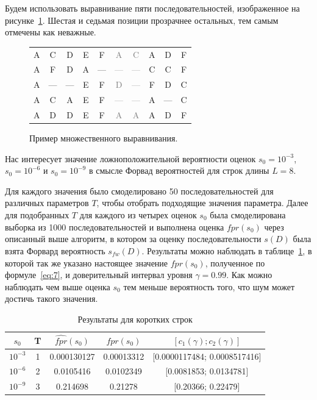 \documentclass[specialist,
substylefile = spbu_report.rtx,
subf,href,colorlinks=true, 12pt]{disser}
\begin{document}
			Будем использовать выравнивание пяти последовательностей, изображенное на рисунке~\ref{fg:4}. Шестая и седьмая позиции прозрачнее остальных, тем самым отмечены как неважные.		
			\begin{figure}[h]
				\centering
				\begin{tabular}{cccccccccc}
					A&C&D&E&F&\textcolor{gray}{A}&\textcolor{gray}{C}&A&D&F\\
					A&F&D&A&—&\textcolor{gray}{—}&\textcolor{gray}{—}&C&C&F\\
					A&—&—&E&F&\textcolor{gray}{D}&\textcolor{gray}{—}&F&D&C\\
					A&C&A&E&F&\textcolor{gray}{—}&\textcolor{gray}{—}&A&—&C\\
					A&D&D&E&F&\textcolor{gray}{A}&\textcolor{gray}{A}&A&D&F
				\end{tabular}
				\caption{Пример множественного выравнивания.} 
				\label{fg:4}
			\end{figure}					
			
			Нас интересует значение ложноположительной вероятности оценок $s_{0}=10^{-3}$, $s_{0}=10^{-6}$ и $s_{0}=10^{-9}$ в смысле Форвад вероятностей для строк длины $L=8$.
			
			Для каждого значения было смоделировано 50 последовательностей для различных параметров $T$, чтобы отобрать подходящие значения параметра. Далее для подобранных $T$ для каждого из четырех оценок $s_{0}$ была смоделирована выборка из 1000 последовательностей и выполнена оценка $\widehat{fpr}(s_{0})$ через описанный выше алгоритм, в котором за оценку последовательности $s(D)$ была взята Форвард вероятность $s_{fw}(D)$. Результаты можно наблюдать в таблице~\ref{tb:1}, в которой так же указано настоящее значение $fpr(s_0)$, полученное по формуле~\eqref{eq:7}, и доверительный интервал уровня $\gamma = 0.99$. Как можно наблюдать чем выше оценка $s_{0}$ тем меньше вероятность того, что шум может достичь такого значения.
			\begin{table}
				\centering
				\caption{Результаты для коротких строк} 
				\label{tb:1}
				\begin{tabular}{ccccc}
					$s_{0}$&T&$\widehat{fpr}(s_{0})$&$fpr(s_{0})$&$[c_{1}(\gamma);c_{2}(\gamma)]$  \\ \hline
					$10^{-3}$&1&0.000130127&0.00013312&[0.0000117484; 0.0008517416] \\
					$10^{-6}$&2&0.0105416&0.0102349&[0.0081853; 0.0134781] \\
					$10^{-9}$&3&0.214698&0.21278&[0.20366; 0.22479] \\					
				\end{tabular}
			\end{table}						
						
\end{document}
